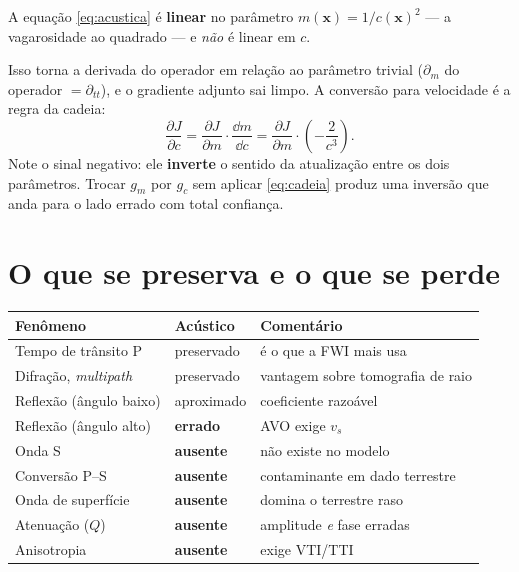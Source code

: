 \documentclass[11pt,a4paper,oneside]{report}
\begin{document}
\begin{teoria}[Por que inverter em $m = 1/c^{2}$]
A equa\c{c}\~ao \eqref{eq:acustica} \'e \textbf{linear} no par\^ametro
$m(\mathbf{x}) = 1/c(\mathbf{x})^{2}$ --- a vagarosidade ao quadrado --- e
\emph{n\~ao} \'e linear em $c$.

Isso torna a derivada do operador em rela\c{c}\~ao ao par\^ametro trivial
($\partial_m$ do operador $= \partial_{tt}$), e o gradiente adjunto sai
limpo. A convers\~ao para velocidade \'e a regra da cadeia:
\begin{equation}
\frac{\partial J}{\partial c}
 = \frac{\partial J}{\partial m}\cdot\frac{\dd m}{\dd c}
 = \frac{\partial J}{\partial m}\cdot\left(-\frac{2}{c^{3}}\right).
\label{eq:cadeia}
\end{equation}
Note o sinal negativo: ele \textbf{inverte} o sentido da atualiza\c{c}\~ao
entre os dois par\^ametros. Trocar $g_m$ por $g_c$ sem aplicar
\eqref{eq:cadeia} produz uma invers\~ao que anda para o lado errado com total
confian\c{c}a.
\end{teoria}

\section{O que se preserva e o que se perde}

\begin{center}
\begin{tabular}{@{}llp{6.4cm}@{}}
\toprule
\textbf{Fen\^omeno} & \textbf{Ac\'ustico} & \textbf{Coment\'ario} \\
\midrule
Tempo de tr\^ansito P & preservado & \'e o que a FWI mais usa \\
Difra\c{c}\~ao, \emph{multipath} & preservado & vantagem sobre tomografia de raio \\
Reflex\~ao (\^angulo baixo) & aproximado & coeficiente razo\'avel \\
Reflex\~ao (\^angulo alto) & \textbf{errado} & AVO exige $v_s$ \\
Onda S & \textbf{ausente} & n\~ao existe no modelo \\
Convers\~ao P--S & \textbf{ausente} & contaminante em dado terrestre \\
Onda de superf\'icie & \textbf{ausente} & domina o terrestre raso \\
Atenua\c{c}\~ao ($Q$) & \textbf{ausente} & amplitude \emph{e} fase erradas \\
Anisotropia & \textbf{ausente} & exige VTI/TTI \\
\bottomrule
\end{tabular}
\end{center}
\end{document}
